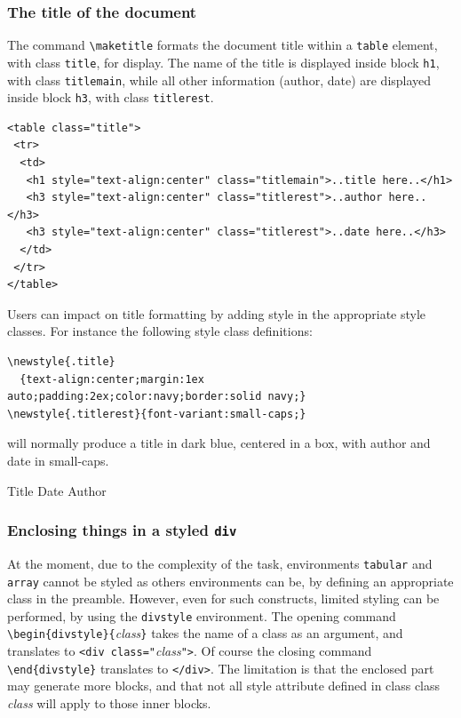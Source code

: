 \subsubsection{The title of the document}
The command \verb+\maketitle+ formats the document
title within a \verb+table+ element, with
class \texttt{title}, for display. The name of the title is displayed
inside block \verb+h1+, with class \texttt{titlemain}, while all other
information (author, date) are displayed inside block \verb+h3+, with class
\texttt{titlerest}.
\begin{verbatim}
<table class="title">
 <tr>
  <td>
   <h1 style="text-align:center" class="titlemain">..title here..</h1>
   <h3 style="text-align:center" class="titlerest">..author here..</h3>
   <h3 style="text-align:center" class="titlerest">..date here..</h3>
  </td>
 </tr>
</table>
\end{verbatim}
Users can impact  on title formatting by adding style in the
appropriate style classes.
For instance the following style class definitions:
\begin{verbatim}
\newstyle{.title}
  {text-align:center;margin:1ex auto;padding:2ex;color:navy;border:solid navy;}
\newstyle{.titlerest}{font-variant:small-caps;}
\end{verbatim}
will normally produce a title in dark blue, centered in a box, with
author and date in small-caps.
\begin{htmlonly}
Title
Date
Author
\end{htmlonly}

\subsubsection{Enclosing things in a styled \texttt{div}}
%
%
At the moment, due to the complexity of the task, environments
\texttt{tabular} and \texttt{array} cannot be styled as others
environments can be, 
by defining an appropriate class in the preamble.
However, even for such constructs,
limited styling can be performed, by using
the \texttt{divstyle} environment.
The opening command \verb+\begin{divstyle}{+\textit{class}\verb+}+
takes the name of a class as
an argument, and translates to \verb+<div class="+\textit{class}\verb+">+.
Of course the closing command \verb+\end{divstyle}+ translates to
\verb+</div>+.
The limitation is that the enclosed part may generate more {\html}
blocks, and that not all style attribute defined in class class
\textit{class} will apply to those inner blocks.

